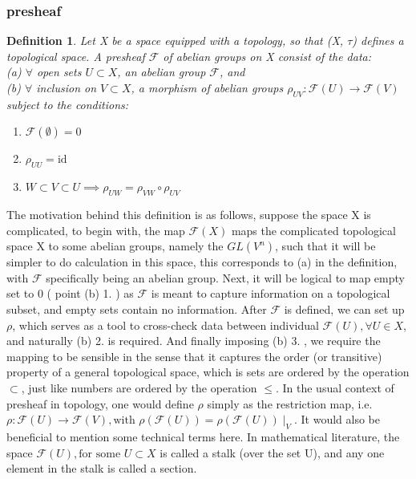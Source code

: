\documentclass{article}
\newtheorem{definition}{Definition}
\begin{document}
  \subsubsection{presheaf}%
    \label{sub:presheaf}
    \begin{definition}
      Let X be a space equipped with a topology, so that (X,
      $\tau$)
      defines a topological space. A presheaf $ \mathcal{F} $ of
      abelian groups on X consist of the data: \\ 
      (a) $\forall$ open sets $ U \subset X $, an abelian group $
      \mathcal{F} $, and \\ 
      (b) $\forall $ inclusion on $ V \subset X $, a morphism of
      abelian groups $ \rho_{U V}: \mathcal{F}(U) \to
      \mathcal{F}(V) $ subject to the conditions: \\ 
      \begin{enumerate}
        \item $ \mathcal{F}(\emptyset) = 0 $   
        \item $ \rho_{UU} = \text{id} $
        \item $ W \subset V \subset U \implies \rho_{UW} =
        \rho_{VW} \circ \rho_{UV} $
      \end{enumerate}
    \end{definition}
The motivation behind this definition is as follows,
suppose the space X is complicated, to begin with, the map
$\mathcal{F}(X)$ maps the complicated topological space X to some abelian
groups, namely the $GL(V^{n})$, such that it will be simpler to do
calculation in this space, this corresponds to (a) in the definition,
with $\mathcal{F}$ specifically being an abelian group. 
Next, it will be logical to map empty set to 0 ( point (b) 1. ) as $
\mathcal{F} $ is meant to capture information on a topological subset, and
empty sets contain no information.
After $\mathcal{F}$ is defined, we can set up $\rho$, which serves as a
tool to cross-check data between individual $\mathcal{F}(U), \forall U
\in X$, and naturally (b) 2. is required. And finally imposing (b) 3. 
, we require the mapping to be sensible in
the sense that it captures the order (or transitive) property of a general
topological space, which is sets are ordered by the operation $ \subset $,
just like numbers are ordered by the operation $ \le $. In the usual context of
presheaf in topology, one would define $\rho$ simply as the restriction
map, i.e. $\rho: \mathcal{F}(U) \to \mathcal{F}(V), \text{with }
\rho(\mathcal{F}(U)) = \rho(\mathcal{F}(U)) \mid_{V}$. 
It would also be beneficial to mention some technical terms here. In
mathematical literature, the space $\mathcal{F}(U), \text{for some } U
\subset X$ is called a stalk (over the set U), and any one element in
the stalk is called a section. 
\end{document}
